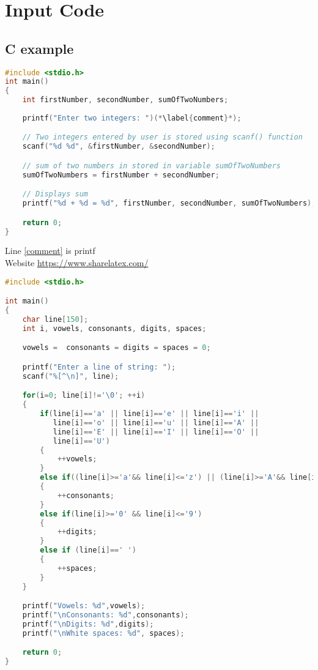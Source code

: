 \chapter{Input Code}
\section{C example}
\begin{lstlisting}[language=C,caption=Code C example]
#include <stdio.h>
int main()
{
    int firstNumber, secondNumber, sumOfTwoNumbers;
    
    printf("Enter two integers: ")(*\label{comment}*);

    // Two integers entered by user is stored using scanf() function
    scanf("%d %d", &firstNumber, &secondNumber);

    // sum of two numbers in stored in variable sumOfTwoNumbers
    sumOfTwoNumbers = firstNumber + secondNumber;

    // Displays sum      
    printf("%d + %d = %d", firstNumber, secondNumber, sumOfTwoNumbers);

    return 0;
}
\end{lstlisting}
Line \ref{comment} is printf\\
Website \url{https://www.sharelatex.com/}
\newpage
\begin{lstlisting}[language=C,caption=Another code C example]
#include <stdio.h>

int main()
{
    char line[150];
    int i, vowels, consonants, digits, spaces;

    vowels =  consonants = digits = spaces = 0;

    printf("Enter a line of string: ");
    scanf("%[^\n]", line);

    for(i=0; line[i]!='\0'; ++i)
    {
        if(line[i]=='a' || line[i]=='e' || line[i]=='i' ||
           line[i]=='o' || line[i]=='u' || line[i]=='A' ||
           line[i]=='E' || line[i]=='I' || line[i]=='O' ||
           line[i]=='U')
        {
            ++vowels;
        }
        else if((line[i]>='a'&& line[i]<='z') || (line[i]>='A'&& line[i]<='Z'))
        {
            ++consonants;
        }
        else if(line[i]>='0' && line[i]<='9')
        {
            ++digits;
        }
        else if (line[i]==' ')
        {
            ++spaces;
        }
    }

    printf("Vowels: %d",vowels);
    printf("\nConsonants: %d",consonants);
    printf("\nDigits: %d",digits);
    printf("\nWhite spaces: %d", spaces);

    return 0;
}
\end{lstlisting}
\newpage
